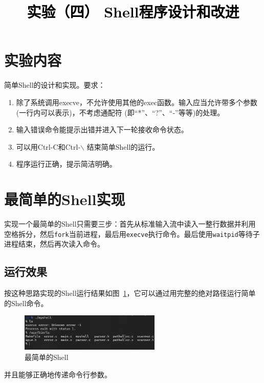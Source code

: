 \documentclass[a4paper,twoside]{article}
\newcommand{\PaperTitle}{实验（四） Shell程序设计和改进}  %
\begin{document}
\newpage

\title{
	\Large{\textcolor{black}{\PaperTitle}}
}
	
	
\maketitle
	
\tableofcontents
 
\newpage
\setcounter{page}{1}

\begin{spacing}{1.2}

\section{实验内容}

简单Shell的设计和实现。要求：

\begin{enumerate}
    \item 除了系统调用execve，不允许使用其他的exec函数。输入应当允许带多个参数(一行内可以表示)，不考虑通配符 (即“*”、“?”、“-”等等)的处理。
    \item 输入错误命令能提示出错并进入下一轮接收命令状态。
    \item 可以用Ctrl-C和Ctrl-$\backslash$ 结束简单Shell的运行。
    \item 程序运行正确，提示简洁明确。
\end{enumerate}

\section{最简单的Shell实现}

实现一个最简单的Shell只需要三步：首先从标准输入流中读入一整行数据并利用空格拆分，然后\texttt{fork}当前进程，最后用\texttt{execve}执行命令。最后使用\texttt{waitpid}等待子进程结束，然后再次读入命令。

\subsection{运行效果}

按这种思路实现的Shell运行结果如图~\ref{fig:minimal}，它可以通过用完整的绝对路径运行简单的Shell命令。
\begin{figure}[htb]
	\centering
	\caption{最简单的Shell}
	\label{fig:minimal}
	\includegraphics[width=0.6\textwidth]{minimal.png}
\end{figure}
并且能够正确地传递命令行参数。


\end{spacing}
\end{document}
